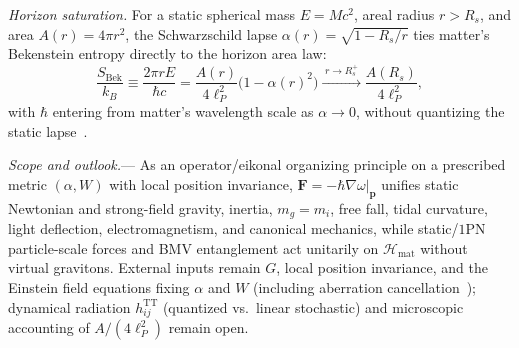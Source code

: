 \documentclass[aps,prl,reprint,superscriptaddress,nofootinbib,floatfix]{revtex4-2}
\theoremstyle{prlthm}
\newcommand{\prlsec}[1]{\par\smallskip\noindent\emph{#1.}---}
\begin{document}
\emph{Horizon saturation.} For a static spherical mass $E=Mc^2$, areal radius $r>R_s$, and area $A(r)=4\pi r^2$, the Schwarzschild lapse $\alpha(r)=\sqrt{1-R_s/r}$ ties matter's Bekenstein entropy directly to the horizon area law:
\begin{equation}
  \frac{S_\text{Bek}}{k_B}\equiv\frac{2\pi rE}{\hbar c}=\frac{A(r)}{4\ell_P^2}\big(1-\alpha(r)^2\big)\xrightarrow{\;r\to R_s^+\;}\frac{A(R_s)}{4\ell_P^2},
  \label{eq:bek_sat}
\end{equation}
with $\hbar$ entering from matter's wavelength scale as $\alpha\to 0$, without quantizing the static lapse~\citep{Bousso2002,Marolf2009}.

\prlsec{Scope and outlook}
As an operator/eikonal organizing principle on a prescribed metric $(\alpha,W)$ with local position invariance, $\mathbf{F}=-\hbar\nabla\omega|_{\mathbf{p}}$ unifies static Newtonian and strong-field gravity, inertia, $m_g=m_i$, free fall, tidal curvature, light deflection, electromagnetism, and canonical mechanics, while static/$1$PN particle-scale forces and BMV entanglement act unitarily on $\mathcal{H}_\text{mat}$ without virtual gravitons. External inputs remain $G$, local position invariance, and the Einstein field equations fixing $\alpha$ and $W$ (including aberration cancellation~\citep{Carlip2000Aberration}); dynamical radiation $h_{ij}^\text{TT}$ (quantized vs.\ linear stochastic) and microscopic accounting of $A/(4\ell_P^2)$ remain open.



\end{document}
